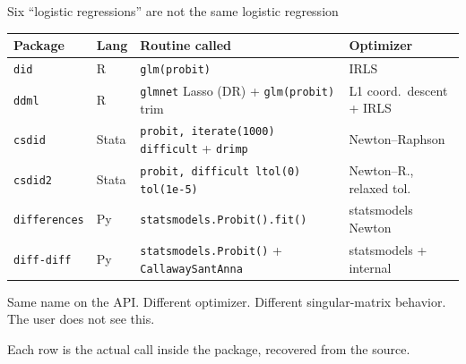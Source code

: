 \documentclass[aspectratio=169,11pt]{beamer}
\begin{document}
\begin{frame}{Six ``logistic regressions'' are not the same logistic regression}

\vspace{0.1cm}

\begin{center}
\scriptsize
\renewcommand{\arraystretch}{1.18}
\begin{tabular}{@{}llll@{}}
\toprule
Package & Lang & Routine called & Optimizer \\
\midrule
\texttt{did} & R & \texttt{glm(probit)} & IRLS \\
\texttt{ddml} & R & \texttt{glmnet} Lasso (DR) + \texttt{glm(probit)} trim & L1 coord.\ descent + IRLS \\
\texttt{csdid} & Stata & \texttt{probit, iterate(1000) difficult} + \texttt{drimp} & Newton--Raphson \\
\texttt{csdid2} & Stata & \texttt{probit, difficult ltol(0) tol(1e-5)} & Newton--R., relaxed tol. \\
\texttt{differences} & Py & \texttt{statsmodels.Probit().fit()} & statsmodels Newton \\
\texttt{diff-diff} & Py & \texttt{statsmodels.Probit()} + \texttt{CallawaySantAnna} & statsmodels + internal \\
\bottomrule
\end{tabular}
\end{center}

\vspace{0.3cm}

\alert{Same name on the API. Different optimizer. Different singular-matrix behavior. The user does not see this.}

\vspace{0.1cm}

{\scriptsize\color{warmgray} Each row is the actual call inside the package, recovered from the source.}

\end{frame}
\end{document}
